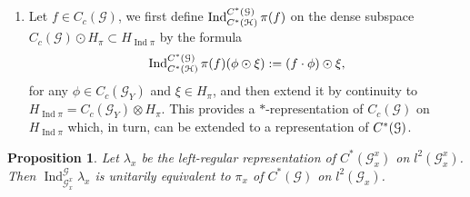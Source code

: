 \documentclass[a4paper]{amsart}
\newcommand{\Ind}{\operatorname{Ind}}
\newcommand\Cstar{C\sp{\ast}}
\newcommand{\maG}{\mathcal G}
\newcommand{\maH}{\mathcal H}
\newcommand\<{\langle}
\renewcommand\>{\rangle}
\newtheorem{proposition}[theorem]{Proposition}
\theoremstyle{definition}
\theoremstyle{remark}
\begin{document}
\begin{enumerate}
\item[\text{Step 4:}]
Let $f\in C_c(\maG)$, we first define $\Ind_{\Cstar(\maH)}^{\Cstar(\maG)}\pi (f)$ on the dense subspace $C_c(\maG) \odot H_\pi\subset H_{\Ind \pi}$ by the formula
$$\Ind_{\Cstar(\maH)}^{\Cstar(\maG)}\pi (f) (\phi \odot \xi):= (f \cdot \phi) \odot \xi,$$
for any $\phi \in C_c(\maG_Y)$ and $\xi \in H_{\pi}$, and then extend it by continuity to $H_{\Ind \pi}= C_c(\maG_Y)\otimes H_{\pi}$. This provides a $*$-representation of $C_c(\maG)$ on $H_{\Ind \pi}$ which, in turn, can be extended to a representation of $\Cstar(\maG)$.
\end{enumerate}

\begin{proposition}
Let $\lambda_x$ be the left-regular representation of $C^*(\maG_x^x)$ on $l^2(\maG_x^x)$.
Then $\Ind_{\maG_x^x}^{\maG}\lambda_x$ is unitarily equivalent to $\pi_x$ of $C^*(\maG)$ on $l^2(\maG_x)$.
\end{proposition}

\vspace{0.3cm}


\end{document}
